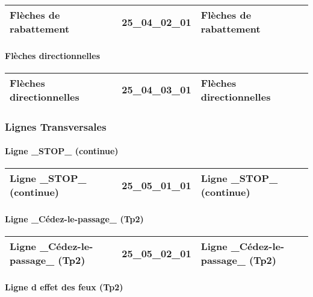 \documentclass[12pt,titlepage,oneside]{book}
\begin{document}
\renewcommand{\arraystretch}{1.2}
\begin{supertabular}{|p{10cm}|c|p{15cm}|}
 Flèches de rabattement & 25\_04\_02\_01 & Flèches de rabattement\\
\hline
\end{supertabular}


\paragraph{Flèches directionnelles}
\noindent
\vspace{\baselineskip}

\renewcommand{\arraystretch}{1.2}
\begin{supertabular}{|p{10cm}|c|p{15cm}|}
 Flèches directionnelles & 25\_04\_03\_01 & Flèches directionnelles\\
\hline
\end{supertabular}

\subsubsection{\large Lignes Transversales}
\paragraph{Ligne \_STOP\_ (continue)}
\noindent
\vspace{\baselineskip}

\renewcommand{\arraystretch}{1.2}
\begin{supertabular}{|p{10cm}|c|p{15cm}|}
 Ligne \_STOP\_ (continue) & 25\_05\_01\_01 & Ligne \_STOP\_ (continue)\\
\hline
\end{supertabular}


\paragraph{Ligne \_Cédez-le-passage\_ (Tp2)}
\noindent
\vspace{\baselineskip}

\renewcommand{\arraystretch}{1.2}
\begin{supertabular}{|p{10cm}|c|p{15cm}|}
 Ligne \_Cédez-le-passage\_ (Tp2) & 25\_05\_02\_01 & Ligne \_Cédez-le-passage\_ (Tp2)\\
\hline
\end{supertabular}


\paragraph{Ligne d effet des feux (Tp2)}
\noindent
\vspace{\baselineskip}
\end{document}

